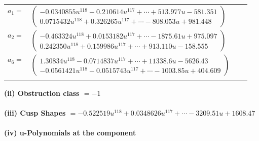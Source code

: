 \documentclass[1p]{elsarticle_modified}
\theoremstyle{definition}
\begin{document}
\begin{tabular}{m{7pt} m{180pt} m{7pt} m{180pt} }
\flushright $a_{1}=$&$\begin{pmatrix}-0.0340855 u^{118}-0.210614 u^{117}+\cdots+513.977 u-581.351\\0.0715432 u^{118}+0.326265 u^{117}+\cdots-808.053 u+981.448\end{pmatrix}$ \\
\flushright $a_{2}=$&$\begin{pmatrix}-0.463324 u^{118}+0.0153182 u^{117}+\cdots-1875.61 u+975.097\\0.242350 u^{118}+0.159986 u^{117}+\cdots+913.110 u-158.555\end{pmatrix}$ \\
\flushright $a_{6}=$&$\begin{pmatrix}1.30834 u^{118}-0.0714837 u^{117}+\cdots+11338.6 u-5626.43\\-0.0561421 u^{118}-0.0515743 u^{117}+\cdots-1003.85 u+404.609\end{pmatrix}$\\&\end{tabular}
\flushleft \textbf{(ii) Obstruction class $= -1$}\\~\\
\flushleft \textbf{(iii) Cusp Shapes $= -0.522519 u^{118}+0.0348626 u^{117}+\cdots-3209.51 u+1608.47$}\\~\\
\newpage\renewcommand{\arraystretch}{1}
\flushleft \textbf{(iv) u-Polynomials at the component}\newline \\
\end{document}

